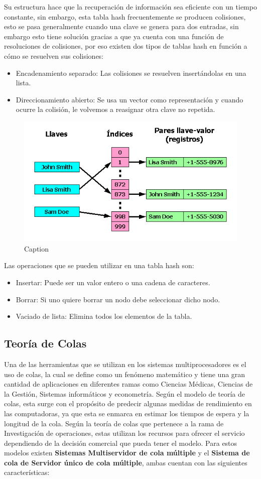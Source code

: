 \documentclass[conference,letterpaper]{IEEEtran}
\begin{document}
Su estructura hace que la recuperación de información sea eficiente con un tiempo constante, sin embargo, esta tabla hash frecuentemente se producen colisiones, esto se pasa generalmente cuando una clave se genera para dos entradas, sin embargo esto tiene solución gracias a que ya cuenta con una función de resoluciones de colisiones, por eso existen dos tipos de tablas hash en función a cómo se resuelven sus colisiones:

\begin{itemize}
    \item Encadenamiento separado: Las colisiones se resuelven insertándolas en una lista.
    \item Direccionamiento abierto: Se usa un vector como representación y cuando ocurre la colisión, le volvemos a reasignar otra clave no repetida.
\end{itemize}

\begin{figure}[thpb]
    \centering
    \includegraphics[width=0.55\linewidth]{Tabla_hash1.png}
    \caption{Caption}
    \label{fig:hash}
\end{figure}

Las operaciones que se pueden utilizar en una tabla hash son:
\begin{itemize}
    \item Insertar: Puede ser un valor entero o una cadena de caracteres.
    \item Borrar: Si uno quiere borrar un nodo debe seleccionar dicho nodo.
    \item Vaciado de lista: Elimina todos los elementos de la tabla.
\end{itemize}

\subsection{Teor\'ia de Colas}
Una de las herramientas que se utilizan en los sistemas multiprocesadores es el uso de colas, la cual se define como un fen\'omeno matem\'atico y tiene una gran cantidad de aplicaciones en diferentes ramas como Ciencias Médicas, Ciencias de la Gestión, Sistemas inform\'aticos y econometría. Según el modelo de teoría de colas, esta surge con el propósito de predecir algunas medidas de rendimiento en las computadoras, ya que esta se enmarca en estimar los tiempos de espera y la longitud de la cola. Según la teoría de colas que pertenece a la rama de Investigación de operaciones, estas utilizan los recursos para ofrecer el servicio dependiendo de la decisión comercial que pueda tener el modelo. Para estos modelos existen \textbf{Sistemas Multiservidor de cola múltiple} y el \textbf{Sistema de cola de Servidor único de cola múltiple}, ambas cuentan con las siguientes características:
\end{document}
